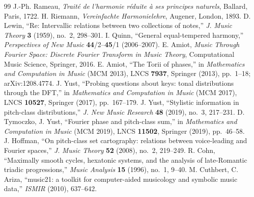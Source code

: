 \documentclass[11pt]{article}
\begin{document}
\begin{thebibliography}{99}
 J.-Ph. Rameau, \emph{Trait\'e de l'harmonie r\'eduite \`a ses principes naturels},
  Ballard, Paris, 1722.
 H. Riemann, \emph{Vereinfachte Harmonielehre}, Augener, London, 1893.
 D. Lewin, ``Re: Intervallic relations between two collections of notes,''
  \emph{J. Music Theory} \textbf{3} (1959), no.~2, 298--301.
 I. Quinn, ``General equal-tempered harmony,'' \emph{Perspectives of New Music}
  \textbf{44}/2--\textbf{45}/1 (2006--2007).
 E. Amiot, \emph{Music Through Fourier Space: Discrete Fourier Transform in Music Theory},
  Computational Music Science, Springer, 2016.
 E. Amiot, ``The Torii of phases,'' in \emph{Mathematics and Computation in Music}
  (MCM 2013), LNCS \textbf{7937}, Springer (2013), pp.~1--18; arXiv:1208.4774.
 J. Yust, ``Probing questions about keys: tonal distributions through the DFT,'' in
  \emph{Mathematics and Computation in Music} (MCM 2017), LNCS \textbf{10527}, Springer (2017),
  pp.~167--179.
 J. Yust, ``Stylistic information in pitch-class distributions,'' \emph{J. New Music
  Research} \textbf{48} (2019), no.~3, 217--231.
 D. Tymoczko, J. Yust, ``Fourier phase and pitch-class sum,'' in \emph{Mathematics and
  Computation in Music} (MCM 2019), LNCS \textbf{11502}, Springer (2019), pp.~46--58.
 J. Hoffman, ``On pitch-class set cartography: relations between voice-leading and
  Fourier spaces,'' \emph{J. Music Theory} \textbf{52} (2008), no.~2, 219--249.
 R. Cohn, ``Maximally smooth cycles, hexatonic systems, and the analysis of late-Romantic
  triadic progressions,'' \emph{Music Analysis} \textbf{15} (1996), no.~1, 9--40.
 M. Cuthbert, C. Ariza, ``music21: a toolkit for computer-aided musicology and symbolic music
  data,'' \emph{ISMIR} (2010), 637--642.
\end{thebibliography}
\end{document}
